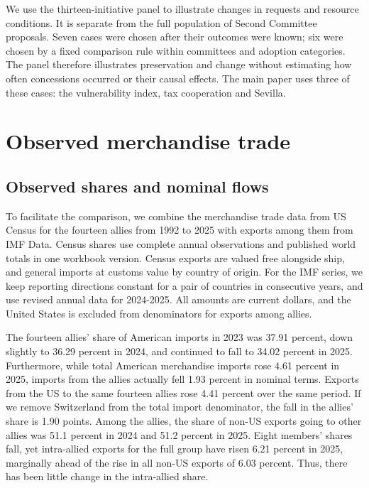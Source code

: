\documentclass[10pt,authoryear]{elsarticle}
\begin{document}
We use the thirteen-initiative panel to illustrate changes in requests and resource conditions. It is separate from the full population of Second Committee proposals. Seven cases were chosen after their outcomes were known; six were chosen by a fixed comparison rule within committees and adoption categories. The panel therefore illustrates preservation and change without estimating how often concessions occurred or their causal effects. The main paper uses three of these cases: the vulnerability index, tax cooperation and Sevilla.

\section{Observed merchandise trade}
\label{sec:trade-overview}

\subsection{Observed shares and nominal flows}

To facilitate the comparison, we combine the merchandise trade data from US Census for the fourteen allies from 1992 to 2025 with exports among them from IMF Data. Census shares use complete annual observations and published world totals in one workbook version. Census exports are valued free alongside ship, and general imports at customs value by country of origin. For the IMF series, we keep reporting directions constant for a pair of countries in consecutive years, and use revised annual data for 2024-2025. All amounts are current dollars, and the United States is excluded from denominators for exports among allies.

The fourteen allies’ share of American imports in 2023 was 37.91 percent, down slightly to 36.29 percent in 2024, and continued to fall to 34.02 percent in 2025. Furthermore, while total American merchandise imports rose 4.61 percent in 2025, imports from the allies actually fell 1.93 percent in nominal terms. Exports from the US to the same fourteen allies rose 4.41 percent over the same period. If we remove Switzerland from the total import denominator, the fall in the allies’ share is 1.90 points. Among the allies, the share of non-US exports going to other allies was 51.1 percent in 2024 and 51.2 percent in 2025. Eight members’ shares fall, yet intra-allied exports for the full group have risen 6.21 percent in 2025, marginally ahead of the rise in all non-US exports of 6.03 percent. Thus, there has been little change in the intra-allied share.
\end{document}
